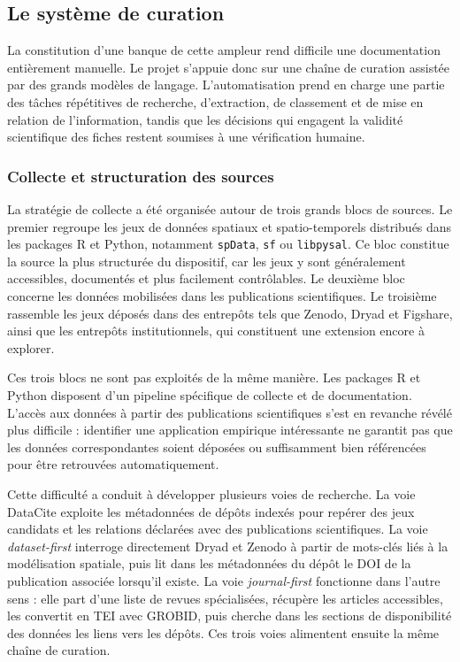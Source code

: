 \documentclass[11pt,a4paper]{article}
\begin{document}
\subsection{Le système de curation}
La constitution d'une banque de cette ampleur rend difficile une documentation entièrement manuelle. Le projet s'appuie donc sur une chaîne de curation assistée par des grands modèles de langage. L'automatisation prend en charge une partie des tâches répétitives de recherche, d'extraction, de classement et de mise en relation de l'information, tandis que les décisions qui engagent la validité scientifique des fiches restent soumises à une vérification humaine.

\subsubsection{Collecte et structuration des sources}

La stratégie de collecte a été organisée autour de trois grands blocs de sources. Le premier regroupe les jeux de données spatiaux et spatio-temporels distribués dans les packages R et Python, notamment \texttt{spData}, \texttt{sf} ou \texttt{libpysal}. Ce bloc constitue la source la plus structurée du dispositif, car les jeux y sont généralement accessibles, documentés et plus facilement contrôlables. Le deuxième bloc concerne les données mobilisées dans les publications scientifiques. Le troisième rassemble les jeux déposés dans des entrepôts tels que Zenodo, Dryad et Figshare, ainsi que les entrepôts institutionnels, qui constituent une extension encore à explorer.

Ces trois blocs ne sont pas exploités de la même manière. Les packages R et Python disposent d'un pipeline spécifique de collecte et de documentation. L'accès aux données à partir des publications scientifiques s'est en revanche révélé plus difficile : identifier une application empirique intéressante ne garantit pas que les données correspondantes soient déposées ou suffisamment bien référencées pour être retrouvées automatiquement.

Cette difficulté a conduit à développer plusieurs voies de recherche. La voie DataCite exploite les métadonnées de dépôts indexés pour repérer des jeux candidats et les relations déclarées avec des publications scientifiques. La voie \textit{dataset-first} interroge directement Dryad et Zenodo à partir de mots-clés liés à la modélisation spatiale, puis lit dans les métadonnées du dépôt le DOI de la publication associée lorsqu'il existe. La voie \textit{journal-first} fonctionne dans l'autre sens : elle part d'une liste de revues spécialisées, récupère les articles accessibles, les convertit en TEI avec GROBID, puis cherche dans les sections de disponibilité des données les liens vers les dépôts. Ces trois voies alimentent ensuite la même chaîne de curation.
\end{document}
